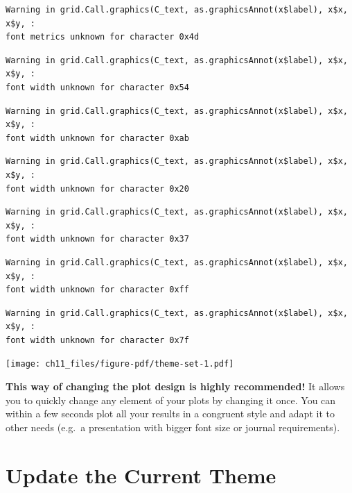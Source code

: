 \documentclass[
  letterpaper,
]{scrbook}
\begin{document}
\begin{verbatim}
Warning in grid.Call.graphics(C_text, as.graphicsAnnot(x$label), x$x, x$y, :
font metrics unknown for character 0x4d
\end{verbatim}

\begin{verbatim}
Warning in grid.Call.graphics(C_text, as.graphicsAnnot(x$label), x$x, x$y, :
font width unknown for character 0x54
\end{verbatim}

\begin{verbatim}
Warning in grid.Call.graphics(C_text, as.graphicsAnnot(x$label), x$x, x$y, :
font width unknown for character 0xab
\end{verbatim}

\begin{verbatim}
Warning in grid.Call.graphics(C_text, as.graphicsAnnot(x$label), x$x, x$y, :
font width unknown for character 0x20
\end{verbatim}

\begin{verbatim}
Warning in grid.Call.graphics(C_text, as.graphicsAnnot(x$label), x$x, x$y, :
font width unknown for character 0x37
\end{verbatim}

\begin{verbatim}
Warning in grid.Call.graphics(C_text, as.graphicsAnnot(x$label), x$x, x$y, :
font width unknown for character 0xff
\end{verbatim}

\begin{verbatim}
Warning in grid.Call.graphics(C_text, as.graphicsAnnot(x$label), x$x, x$y, :
font width unknown for character 0x7f
\end{verbatim}

\texttt{[image: ch11\_files/figure-pdf/theme-set-1.pdf]}

\textbf{This way of changing the plot design is highly recommended!} It
allows you to quickly change any element of your plots by changing it
once. You can within a few seconds plot all your results in a congruent
style and adapt it to other needs (e.g.~a presentation with bigger font
size or journal requirements).

\section{Update the Current Theme}\label{update-the-current-theme}
\end{document}
